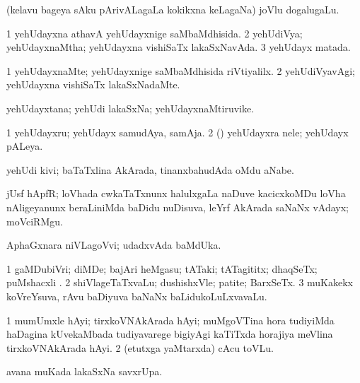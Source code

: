 \bentry
{}
\gl{\nA}
\bmng
(kelavu bageya sAku pArivALagaLa kokikxna keLagaNa) joVlu dogalugaLu. 
\emng
\eentry

\bentry
{}
\gl{\gu}
\bmng
\bnum
\num{1} yehUdayxna athavA yehUdayxnige saMbaMdhisida. 
\num{2} yehUdiVya; yehUdayxnaMtha; yehUdayxna vishiSaTx lakaSxNavAda. 
\num{3} yehUdayx matada. 
\enum
\emng
\eentry

\bentry
{}
\gl{\kirxvi}
\bmng
\bnum
\num{1} yehUdayxnaMte; yehUdayxnige saMbaMdhisida riVtiyalilx. 
\num{2} yehUdiVyavAgi; yehUdayxna vishiSaTx lakaSxNadaMte. 
\enum
\emng
\eentry

\bentry
{}
\gl{\nA}
\bmng
yehUdayxtana; yehUdi lakaSxNa; yehUdayxnaMtiruvike. 
\emng
\eentry

\bentry
{}
\gl{\nA}
\bmng
\bnum
\num{1} yehUdayxru; yehUdayx samudAya, samAja. 
\num{2} (\ca) yehUdayxra nele; yehUdayx pALeya. 
\enum
\emng
\eentry

\bentry
{}
\gl{\nA}
\bmng
yehUdi kivi; baTaTxlina AkArada, tinanxbahudAda oMdu aNabe. 
\emng
\eentry

\bentry
{}
\gl{\nA}
\bmng
jUsf hApfR; loVhada cwkaTaTxnunx halulxgaLa naDuve kacicxkoMDu loVha nAligeyanunx beraLiniMda baDidu nuDisuva, leYrf AkArada saNaNx vAdayx; moVciRMgu.   
\emng
\eentry

\bentry
{}
\gl{\nA}
\bmng
AphaGxnara niVLagoVvi; udadxvAda baMdUka. 
\emng
\eentry

\bentry
{}
\gl{\nA}
\bmng
\bnum
\num{1} gaMDubiVri; diMDe; bajAri heMgasu; tATaki; tATagititx; dhaqSeTx; puMshacxli . 
\num{2} shiVlageTaTxvaLu; dushishxVle; patite; BarxSeTx. 
\num{3} muKakekx koVreYsuva, rAvu baDiyuva baNaNx baLidukoLuLxvavaLu. 
\enum
\emng
\eentry

\bentry
{}
\gl{\nA}
\bmng
\bnum
\num{1} mumUmxle hAyi; tirxkoVNAkArada hAyi; muMgoVTina hora tudiyiMda haDagina kUvekaMbada tudiyavarege bigiyAgi kaTiTxda horajiya meVlina tirxkoVNAkArada hAyi. 
\num{2} (etutxga yaMtarxda) cAcu toVLu. 
\enum
\emng

\noindent
\gl{\nuga}
\bmng
{} avana muKada lakaSxNa savxrUpa. 
\emng
\eentry

